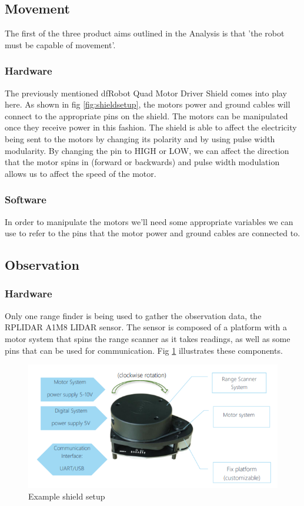			\subsection{Movement}
			The first of the three product aims outlined in the Analysis is that 'the robot must be capable of movement'.
				\subsubsection{Hardware}
				The previously mentioned dfRobot Quad Motor Driver Shield comes into play here. As shown in fig \ref{fig:shieldsetup}, the motors power and ground cables will connect to the appropriate pins on the shield. The motors can be manipulated once they receive power in this fashion. The shield is able to affect the electricity being sent to the motors by changing its polarity and by using pulse width modularity. By changing the pin to HIGH or LOW, we can affect the direction that the motor spins in (forward or backwards) and pulse width modulation allows us to affect the speed of the motor.
				
				\subsubsection{Software}
				In order to manipulate the motors we'll need some appropriate variables we can use to refer to the pins that the motor power and ground cables are connected to. %
				

				
			\subsection{Observation}
				\subsubsection{Hardware}
				Only one range finder is being used to gather the observation data, the RPLIDAR A1M8 LIDAR sensor. The sensor is composed of a platform with a motor system that spins the range scanner as it takes readings, as well as some pins that can be used for communication. Fig \ref{fig:rplidarconfig} illustrates these components.
				
				\begin{figure}[h]
					\centering
					\includegraphics[width=.9\linewidth]{SYNTHESIS/rplidar_configuration.png}
					\caption{Example shield setup}
					\label{fig:rplidarconfig}
				\end{figure}
				
